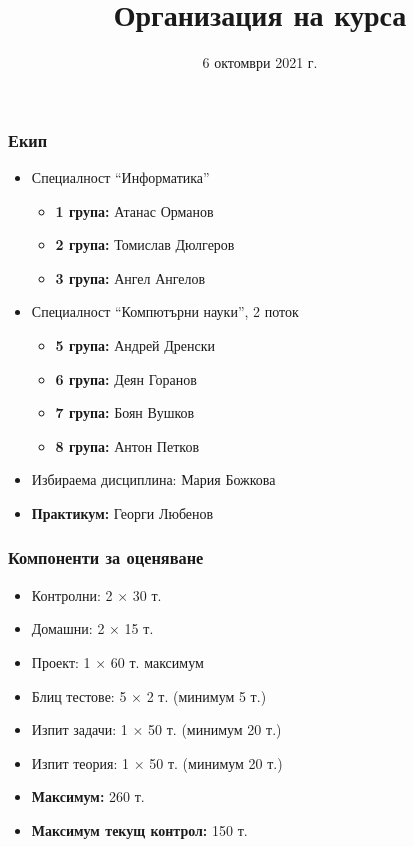 \documentclass[alsotrans]{beamerswitch}
\title{Организация на курса}
\date{6 октомври 2021 г.}
\begin{document}
\begin{frame}
  \titlepage
\end{frame}

\begin{frame}
  \frametitle{Екип}

  \begin{itemize}
  \item Специалност ``Информатика''
    \begin{itemize}
    \item \textbf{1 група:} Атанас Орманов
    \item \textbf{2 група:} Томислав Дюлгеров
    \item \textbf{3 група:} Ангел Ангелов
    \end{itemize}
  \item Специалност ``Компютърни науки'', 2 поток
    \begin{itemize}
    \item \textbf{5 група:} Андрей Дренски
    \item \textbf{6 група:} Деян Горанов
    \item \textbf{7 група:} Боян Вушков
    \item \textbf{8 група:} Антон Петков
    \end{itemize}
  \item Избираема дисциплина: Мария Божкова
  \item \textbf{Практикум:} Георги Любенов
\end{itemize}
\end{frame}

\begin{frame}
  \frametitle{Компоненти за оценяване}

  \begin{itemize}
  \item Контролни: 2 $\times$ 30 т.
  \item Домашни: 2 $\times$ 15 т.
  \item Проект: 1 $\times$ 60 т. максимум
  \item Блиц тестове: 5 $\times$ 2 т. \alert{(минимум 5 т.)}
  \item Изпит задачи: 1 $\times$ 50 т. \alert{(минимум 20 т.)}
  \item Изпит теория: 1 $\times$ 50 т. \alert{(минимум 20 т.)}
  \item \textbf{Максимум:} 260 т.
  \item \textbf{Максимум текущ контрол:} 150 т.
  \end{itemize}
\end{frame}
\end{document}
